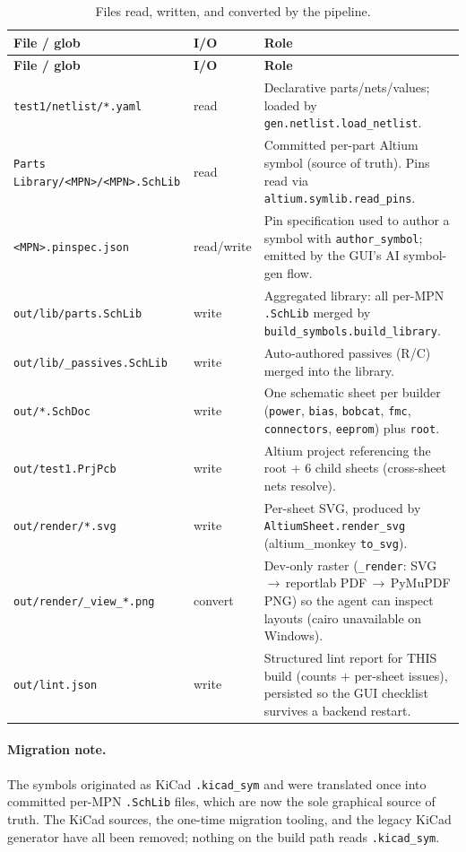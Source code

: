 \documentclass[11pt]{article}
\newcommand{\file}[1]{\texttt{#1}}
\newcommand{\mod}[1]{\texttt{#1}}
\begin{document}
\begin{longtable}{p{} p{} p{}}
\caption{Files read, written, and converted by the pipeline.}\label{tab:files}\\
\toprule
\textbf{File / glob} & \textbf{I/O} & \textbf{Role}\\
\midrule
\endfirsthead
\toprule
\textbf{File / glob} & \textbf{I/O} & \textbf{Role}\\
\midrule
\endhead
\file{test1/netlist/*.yaml} & read & Declarative parts/nets/values; loaded by \mod{gen.netlist.load\_netlist}.\\
\file{Parts Library/<MPN>/<MPN>.SchLib} & read & Committed per-part Altium symbol (source of truth). Pins read via \mod{altium.symlib.read\_pins}.\\
\file{<MPN>.pinspec.json} & read/write & Pin specification used to author a symbol with \mod{author\_symbol}; emitted by the GUI's AI symbol-gen flow.\\
\file{out/lib/parts.SchLib} & write & Aggregated library: all per-MPN \file{.SchLib} merged by \mod{build\_symbols.build\_library}.\\
\file{out/lib/\_passives.SchLib} & write & Auto-authored passives (R/C) merged into the library.\\
\file{out/*.SchDoc} & write & One schematic sheet per builder (\texttt{power}, \texttt{bias}, \texttt{bobcat}, \texttt{fmc}, \texttt{connectors}, \texttt{eeprom}) plus \texttt{root}.\\
\file{out/test1.PrjPcb} & write & Altium project referencing the root + 6 child sheets (cross-sheet nets resolve).\\
\file{out/render/*.svg} & write & Per-sheet SVG, produced by \mod{AltiumSheet.render\_svg} (altium\_monkey \texttt{to\_svg}).\\
\file{out/render/\_view\_*.png} & convert & Dev-only raster (\mod{\_render}: SVG\,$\to$\,reportlab PDF\,$\to$\,PyMuPDF PNG) so the agent can inspect layouts (cairo unavailable on Windows).\\
\file{out/lint.json} & write & Structured lint report for THIS build (counts + per-sheet issues), persisted so the GUI checklist survives a backend restart.\\
\bottomrule
\end{longtable}

\paragraph{Migration note.} The symbols originated as KiCad \file{.kicad\_sym}
and were translated once into committed per-MPN \file{.SchLib} files, which are
now the sole graphical source of truth. The KiCad sources, the one-time
migration tooling, and the legacy KiCad generator have all been removed; nothing
on the build path reads \file{.kicad\_sym}.
\end{document}
